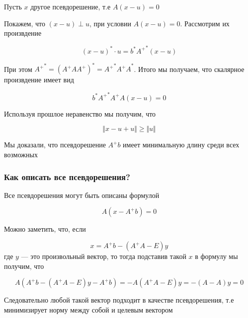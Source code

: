\documentclass{article}
\begin{document}
    \quad 

    Пусть $x$ другое псевдорешение, т.е $A(x - u) = 0$

    Покажем, что $ (x - u) \perp u$, при условии $A(x - u) = 0$.
    Рассмотрим их произвдение

    \begin{equation}
        (x - u)^{*} \cdot u = b^{*} {A^{+}}^{*} (x - u)
    \end{equation}

    При этом ${A^{+}}^{*} = (A^{+} A A^{+})^{*} = {A^{+}}^{*} {A^{+} A}^{*}$. 
    Итого мы получаем, что скалярное произвдение имеет вид 

    \begin{equation}
        b^{*} {A^{+}}^{*} A^{+} A (x - u) = 0
    \end{equation}


    Используя прошлое неравенство мы получим, что 

    \begin{equation}
        \Vert x - u + u \Vert \geq \Vert u \Vert 
    \end{equation}

    Мы доказали, что псевдорешение $A^{+} b$ имеет минимальную длину 
    среди всех возможных 

    \subsubsection{Как описать все псевдорешения?}

    Все псевдорешения могут быть описаны формулой 
    
    \begin{equation}
        A (x - A^{+}b) = 0 
    \end{equation}
    
    Можно заметить, что, если 

    \begin{equation}
        x = A^{+}b - (A^{+}A - E) y
    \end{equation}
    где $y$ --- это произвольный вектор, то тогда подставив такой $x$ в формулу 
    мы получим, что 

    \begin{equation}
        A (A^{+}b - (A^{+}A - E) y - A^{+}b) = - A (A^{+}A - E) y = - (A - A) y = 0
    \end{equation}

    Следовательно любой такой вектор подходит в качестве псевдорешения, т.е минимизирует норму между 
    собой и целевым вектором
\end{document}

